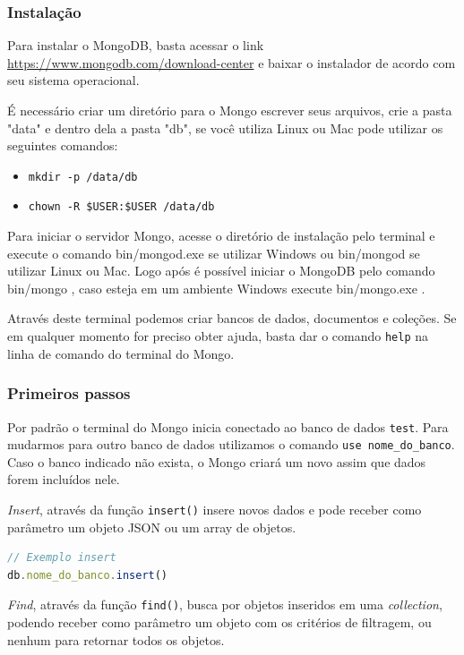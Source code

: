 \documentclass[
	12pt,				%
	openright,			%
	twoside,			%
	a4paper,			%
	english,			%
	brazil				%
	]{abntex2}
\begin{document}
\subsubsection{Instalação}

Para instalar o MongoDB, basta acessar o link \url{https://www.mongodb.com/download-center} e baixar o instalador de acordo com seu sistema operacional.

É necessário criar um diretório para o Mongo escrever seus arquivos, crie a pasta "data" e dentro dela a pasta "db", se você utiliza Linux ou Mac pode utilizar os seguintes comandos:

\begin{itemize}
\item \verb|mkdir -p /data/db|
\item \verb|chown -R $USER:$USER /data/db|
\end{itemize}

Para iniciar o servidor Mongo, acesse o diretório de instalação pelo terminal e execute o comando bin/mongod.exe se utilizar Windows ou bin/mongod se utilizar Linux ou Mac. Logo após é possível iniciar o MongoDB pelo comando bin/mongo , caso esteja em um ambiente Windows execute bin/mongo.exe .

Através deste terminal podemos criar bancos de dados, documentos e coleções. Se em qualquer momento for preciso obter ajuda, basta dar o comando \verb|help| na linha de comando do terminal do Mongo.

\subsubsection{Primeiros passos}

Por padrão o terminal do Mongo inicia conectado ao banco de dados \verb|test|. Para mudarmos para outro banco de dados utilizamos o comando \verb|use nome_do_banco|. Caso o banco indicado não exista, o Mongo criará um novo assim que dados forem incluídos nele.

\textit{Insert}, através da função \verb|insert()| insere novos dados e pode receber como parâmetro um objeto JSON ou um array de objetos.

\begin{lstlisting}[language=javascript]
// Exemplo insert
db.nome_do_banco.insert()
\end{lstlisting}

\textit{Find}, através da função \verb|find()|, busca por objetos inseridos em uma \textit{collection}, podendo receber como parâmetro um objeto com os critérios de filtragem, ou nenhum para retornar todos os objetos.
 
\end{document}
